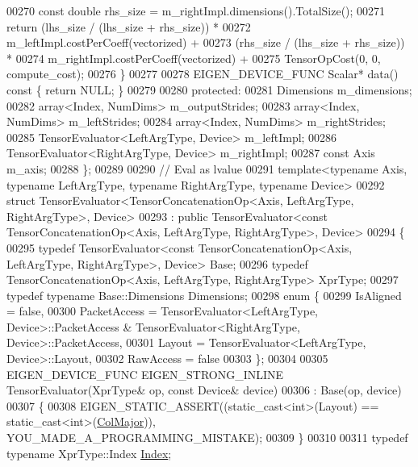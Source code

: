 \begin{DoxyCode}
00270     \textcolor{keyword}{const} \textcolor{keywordtype}{double} rhs\_size = m\_rightImpl.dimensions().TotalSize();
00271     \textcolor{keywordflow}{return} (lhs\_size / (lhs\_size + rhs\_size)) *
00272                m\_leftImpl.costPerCoeff(vectorized) +
00273            (rhs\_size / (lhs\_size + rhs\_size)) *
00274                m\_rightImpl.costPerCoeff(vectorized) +
00275            TensorOpCost(0, 0, compute\_cost);
00276   \}
00277 
00278   EIGEN\_DEVICE\_FUNC Scalar* data()\textcolor{keyword}{ const }\{ \textcolor{keywordflow}{return} NULL; \}
00279 
00280   \textcolor{keyword}{protected}:
00281     Dimensions m\_dimensions;
00282     array<Index, NumDims> m\_outputStrides;
00283     array<Index, NumDims> m\_leftStrides;
00284     array<Index, NumDims> m\_rightStrides;
00285     TensorEvaluator<LeftArgType, Device> m\_leftImpl;
00286     TensorEvaluator<RightArgType, Device> m\_rightImpl;
00287     \textcolor{keyword}{const} Axis m\_axis;
00288 \};
00289 
00290 \textcolor{comment}{// Eval as lvalue}
00291 \textcolor{keyword}{template}<\textcolor{keyword}{typename} Axis, \textcolor{keyword}{typename} LeftArgType, \textcolor{keyword}{typename} RightArgType, \textcolor{keyword}{typename} Device>
00292   \textcolor{keyword}{struct }TensorEvaluator<TensorConcatenationOp<Axis, LeftArgType, RightArgType>, Device>
00293   : \textcolor{keyword}{public} TensorEvaluator<const TensorConcatenationOp<Axis, LeftArgType, RightArgType>, Device>
00294 \{
00295   \textcolor{keyword}{typedef} TensorEvaluator<const TensorConcatenationOp<Axis, LeftArgType, RightArgType>, Device> Base;
00296   \textcolor{keyword}{typedef} TensorConcatenationOp<Axis, LeftArgType, RightArgType> XprType;
00297   \textcolor{keyword}{typedef} \textcolor{keyword}{typename} Base::Dimensions Dimensions;
00298   \textcolor{keyword}{enum} \{
00299     IsAligned = \textcolor{keyword}{false},
00300     PacketAccess = TensorEvaluator<LeftArgType, Device>::PacketAccess & TensorEvaluator<RightArgType,
       Device>::PacketAccess,
00301     Layout = TensorEvaluator<LeftArgType, Device>::Layout,
00302     RawAccess = \textcolor{keyword}{false}
00303   \};
00304 
00305   EIGEN\_DEVICE\_FUNC EIGEN\_STRONG\_INLINE TensorEvaluator(XprType& op, \textcolor{keyword}{const} Device& device)
00306     : Base(op, device)
00307   \{
00308     EIGEN\_STATIC\_ASSERT((static\_cast<int>(Layout) == static\_cast<int>(\hyperlink{group__enums_ggaacded1a18ae58b0f554751f6cdf9eb13a0cbd4bdd0abcfc0224c5fcb5e4f6669a}{ColMajor})), 
      YOU\_MADE\_A\_PROGRAMMING\_MISTAKE);
00309   \}
00310 
00311   \textcolor{keyword}{typedef} \textcolor{keyword}{typename} XprType::Index \hyperlink{namespace_eigen_a62e77e0933482dafde8fe197d9a2cfde}{Index};

\end{DoxyCode}
